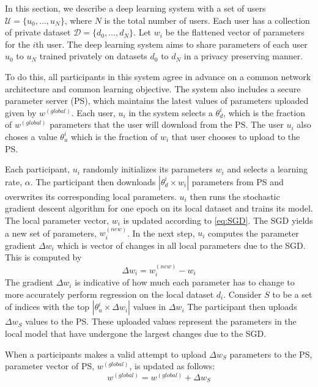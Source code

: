 \documentclass[conference]{IEEEtran}
\begin{document}
In this section, we describe a deep learning system with a set of users $\mathcal{U}= \{u_0, \dots,u_N\}$, where $N$ is the total
number of
users. Each user has a collection of
private dataset  $\mathcal{D}= \{d_0, \dots,d_N\}$. 
Let $w_i$ be the flattened vector of parameters for the $i$th user. The
deep learning system aims to share parameters of each user $u_0$ to $u_N$  trained privately on datasets $d_0$ to $d_N$ in a privacy
preserving manner.

To do this, all participants in this system agree in advance on a
common network architecture and common learning objective. The system also includes a secure parameter server (PS), which maintains the
latest values of parameters uploaded given by $w^{(global)}$. Each user, $u_i$ in the system selects a $\theta_d^{i}$, which is the fraction of  $w^{(global)}$ parameters that the user will download from the PS. 
The user $u_i$ also choses a value $\theta_u^{i}$ which is the fraction of $w_i$ that user chooses to upload to the PS.

Each participant, $u_i$ randomly initializes its parameters $w_i$ and selects a learning rate, $\alpha$.
The participant then downloads $|\theta_d^{i} \times w_i|$ parameters from PS and overwrites its corresponding local parameters.
$u_i$ then runs the stochastic gradient descent algorithm for one epoch on its local dataset and trains its model. The local parameter vector, $w_i$ is updated according to \eqref{eq:SGD}. The SGD yields a new set of parameters, $w_i^{(new)}$.
In the next step, $u_i$ computes the parameter gradient $\Delta w_i$ which is vector of changes in all local parameters due to the SGD. This is computed by
$$\Delta w_i =  w_i^{(new)} -  w_i$$ 
The gradient  $\Delta w_i$ is indicative of how much each parameter has to change to more accurately perform regression on the local dataset $d_i$.
Consider $S$ to be a set of indices with the top  $|\theta_u^{i} \times \Delta w_i|$ values in $\Delta w_i$ 
The participant then uploads  $\Delta w_S$ values to the PS.
These uploaded values represent the parameters in the local model that have undergone the largest changes due to the SGD. 

When a participants makes a valid attempt to upload $\Delta w_S$ parameters to the PS, parameter vector of PS,  $w^{(global)}$, is updated as follows:
$$w^{(global)} =  w^{(global)} +  \Delta w_S$$
\end{document}
